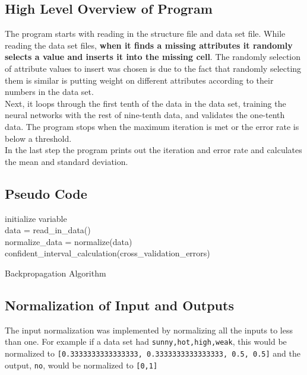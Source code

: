 \documentclass{sig-alternate-05-2015}
\begin{document}
\subsection{High Level Overview of Program}
The program starts with reading in the structure file and data set file. While reading the data set files, \textbf{when it finds a missing attributes it randomly selects a value and inserts it into the missing cell}. The randomly selection of attribute values to insert was chosen is due to the fact that randomly selecting them is similar is putting weight on different attributes according to their numbers in the data set. \\
\indent Next, it loops through the first tenth of the data in the data set, training the neural networks with the rest of nine-tenth data, and validates the one-tenth data. The program stops when the maximum iteration is met or the error rate is below a threshold.\\
\indent In the last step the program prints out the iteration and error rate and calculates the mean and standard deviation.

\subsection{Pseudo Code}
\begin{algorithm}
 initialize variable\\
 data = read\_in\_data()\\
 normalize\_data = normalize(data)\\
  confident\_interval\_calculation(cross\_validation\_errors)
 \caption{Backpropagation Algorithm}
\end{algorithm}


\subsection{Normalization of Input and Outputs}
The input normalization was implemented by normalizing all the inputs to less than one. For example if a data set had \texttt{sunny,hot,high,weak}, this would be normalized to \texttt{[0.3333333333333333, 0.3333333333333333, 0.5, 0.5]} and the output, \texttt{no}, would be normalized to \texttt{[0,1]}
\end{document}
